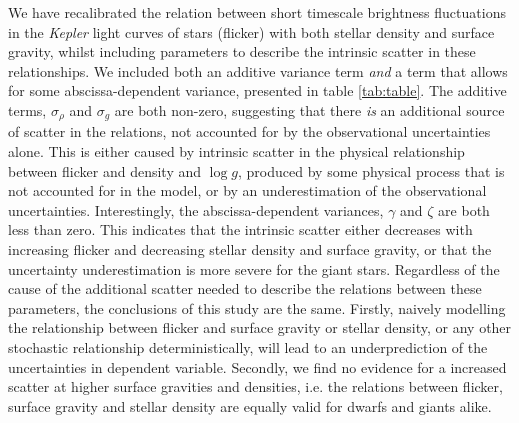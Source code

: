 \documentclass[apjl]{emulateapj}
\newcommand{\logg}{$\log g$}
\begin{document}
We have recalibrated the relation between short timescale brightness
fluctuations in the {\it Kepler} light curves of stars (flicker) with both
stellar density and surface gravity, whilst including parameters to describe
the intrinsic scatter in these relationships.
We included both an additive variance term {\it and} a term that allows for
some abscissa-dependent variance, presented in table \ref{tab:table}.
The additive terms, $\sigma_\rho$ and $ \sigma_g$ are both non-zero,
suggesting that there {\it is} an additional source of scatter in the
relations, not accounted for by the observational uncertainties alone.
This is either caused by intrinsic scatter in the physical relationship
between flicker and density and \logg, produced by some physical process that
is not accounted for in the model, or by an underestimation of the
observational uncertainties.
Interestingly, the abscissa-dependent variances, $\gamma$ and $\zeta$ are both
less than zero.
This indicates that the intrinsic scatter either decreases with increasing
flicker and decreasing stellar density and surface gravity, or that the
uncertainty underestimation is more severe for the giant stars.
Regardless of the cause of the additional scatter needed to describe the
relations between these parameters, the conclusions of this study are the same.
Firstly, naively modelling the relationship between flicker and surface
gravity or stellar density, or any other stochastic relationship
deterministically, will lead to an underprediction of the uncertainties in
dependent variable.
Secondly, we find no evidence for a increased scatter at higher surface
gravities and densities, i.e. the relations between flicker, surface gravity
and stellar density are equally valid for dwarfs and giants alike.
\end{document}
